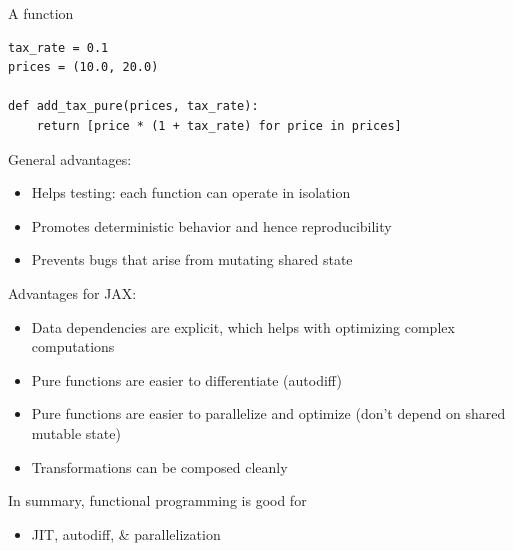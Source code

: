 \begin{frame}[fragile]

    A  function
    \vspace{0.5em}
    \vspace{0.5em}

    \begin{verbatim}
tax_rate = 0.1 
prices = (10.0, 20.0) 

def add_tax_pure(prices, tax_rate):
    return [price * (1 + tax_rate) for price in prices]
    \end{verbatim}
    
\end{frame}


\begin{frame}

    General advantages:

    \begin{itemize}
        \item Helps testing: each function can operate in isolation
        \vspace{0.5em}
        \item Promotes deterministic behavior and hence reproducibility
        \vspace{0.5em}
        \item Prevents bugs that arise from mutating shared state
    \end{itemize}

\end{frame}



\begin{frame}
    
    Advantages for JAX:

     \begin{itemize}
        \item Data dependencies are explicit, which helps with optimizing complex computations 
        \vspace{0.5em}
         \item Pure functions are easier to differentiate (autodiff)
        \vspace{0.5em}
         \item Pure functions are easier to parallelize and optimize (don't
             depend on shared mutable state)
        \vspace{0.5em}
         \item Transformations can be composed cleanly 
     \end{itemize}

        \vspace{0.5em}
        \vspace{0.5em}

     In summary, functional programming is good for 
     \begin{itemize}
         \item JIT, autodiff, \& parallelization
     \end{itemize}


\end{frame}




